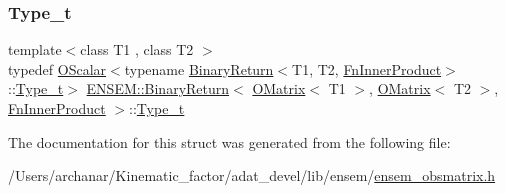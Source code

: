 \mbox{\label{structENSEM_1_1BinaryReturn_3_01OMatrix_3_01T1_01_4_00_01OMatrix_3_01T2_01_4_00_01FnInnerProduct_01_4_a28a5e6d9f636db51eb542a0a4602c034}} 
\subsubsection{\texorpdfstring{Type\_t}{Type\_t}\hspace{0.1cm}{\footnotesize\ttfamily [2/2]}}
{\footnotesize\ttfamily template$<$class T1 , class T2 $>$ \\
typedef \mbox{\hyperlink{classENSEM_1_1OScalar}{O\+Scalar}}$<$typename \mbox{\hyperlink{structENSEM_1_1BinaryReturn}{Binary\+Return}}$<$T1, T2, \mbox{\hyperlink{structENSEM_1_1FnInnerProduct}{Fn\+Inner\+Product}}$>$\+::\mbox{\hyperlink{structENSEM_1_1BinaryReturn_3_01OMatrix_3_01T1_01_4_00_01OMatrix_3_01T2_01_4_00_01FnInnerProduct_01_4_a28a5e6d9f636db51eb542a0a4602c034}{Type\+\_\+t}}$>$ \mbox{\hyperlink{structENSEM_1_1BinaryReturn}{E\+N\+S\+E\+M\+::\+Binary\+Return}}$<$ \mbox{\hyperlink{classENSEM_1_1OMatrix}{O\+Matrix}}$<$ T1 $>$, \mbox{\hyperlink{classENSEM_1_1OMatrix}{O\+Matrix}}$<$ T2 $>$, \mbox{\hyperlink{structENSEM_1_1FnInnerProduct}{Fn\+Inner\+Product}} $>$\+::\mbox{\hyperlink{structENSEM_1_1BinaryReturn_3_01OMatrix_3_01T1_01_4_00_01OMatrix_3_01T2_01_4_00_01FnInnerProduct_01_4_a28a5e6d9f636db51eb542a0a4602c034}{Type\+\_\+t}}}



The documentation for this struct was generated from the following file\+:\begin{DoxyCompactItemize}
\item 
/\+Users/archanar/\+Kinematic\+\_\+factor/adat\+\_\+devel/lib/ensem/\mbox{\hyperlink{lib_2ensem_2ensem__obsmatrix_8h}{ensem\+\_\+obsmatrix.\+h}}\end{DoxyCompactItemize}
